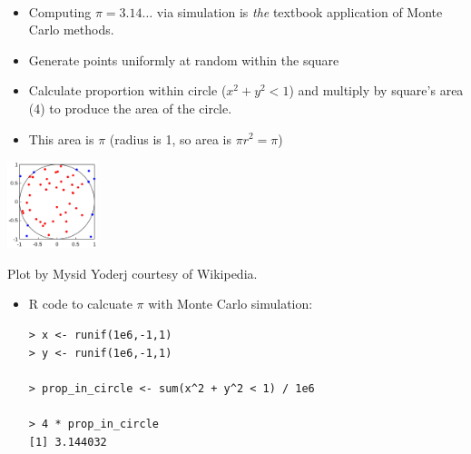 \documentclass[10pt]{report}
\begin{document}
\sf
\vspace*{6pt}
\noindent
\spc{\huge\bfseries \color{MidnightBlue}{Section 3.}
\\[8pt]
\spc{\Huge\bfseries \color{MidnightBlue}{Monte Carlo Methods}}}
\vfill
\noindent
{}
\\[4pt]
\vfill
\hfill 



\noindent
\begin{minipage}[t]{0.65\textwidth}\small
\vspace*{2pt}
\begin{itemize}
\item Computing $\pi = 3.14\ldots$ via simulation is \emph{the} textbook application
of Monte Carlo methods.
\vfill
\item Generate points uniformly at random within the square
\item Calculate proportion within circle ($x^2 + y^2 < 1$) and multiply by square's area (4) to produce the area of the circle.
\item This area is $\pi$ (radius is 1, so area is $\pi r^2 = \pi$)
\end{itemize}
\end{minipage}
%
\begin{minipage}[t]{0.34\textwidth}
\vspace*{12pt}
\hfill \includegraphics[height=1in]{img/mc-integration-wikipedia.png}
\\
\end{minipage}
\vfill
{ } \hfill {\tiny Plot by Mysid Yoderj courtesy of Wikipedia.}

%
\begin{itemize}
\item R code to calcuate $\pi$ with Monte Carlo simulation:
\\[-8pt]
{\small
\begin{Verbatim}
> x <- runif(1e6,-1,1)
> y <- runif(1e6,-1,1)

> prop_in_circle <- sum(x^2 + y^2 < 1) / 1e6

> 4 * prop_in_circle
[1] 3.144032
\end{Verbatim}
}
\end{itemize}
\end{document}
